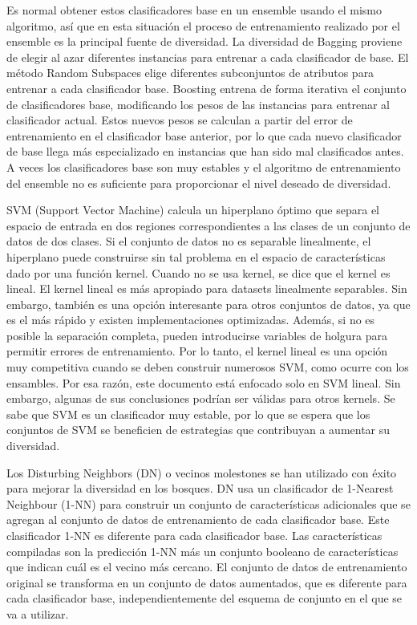 Es normal obtener estos clasificadores base en un ensemble usando el mismo algoritmo, así que en esta situación el proceso de entrenamiento realizado por el ensemble es la principal fuente de diversidad. La diversidad de Bagging proviene de elegir al azar diferentes instancias para entrenar a cada clasificador de base. El método Random Subspaces elige diferentes subconjuntos de atributos para entrenar a cada clasificador base. Boosting entrena de forma iterativa el conjunto de clasificadores base, modificando los pesos de las instancias para entrenar al clasificador actual. Estos nuevos pesos se calculan a partir del error de entrenamiento en el clasificador base anterior, por lo que cada nuevo clasificador de base llega más especializado en instancias que han sido
mal clasificados antes. A veces los clasificadores base son muy estables y el  algoritmo de entrenamiento del ensemble no es suficiente para proporcionar el nivel deseado de diversidad.

SVM (Support Vector Machine) calcula un hiperplano óptimo que separa
el espacio de entrada en dos regiones correspondientes a las clases de un conjunto de datos de dos clases. Si el conjunto de datos no es separable linealmente, el hiperplano puede construirse sin tal problema en el espacio de características dado por una función kernel. Cuando no se usa kernel, se dice que el kernel es lineal. El kernel lineal es más apropiado para datasets linealmente separables. Sin embargo, también es una opción interesante para otros conjuntos de datos, ya que es el más rápido y existen implementaciones optimizadas. Además, si no es posible la separación completa, pueden introducirse variables de holgura para permitir errores de entrenamiento. Por lo tanto, el kernel lineal es una opción muy competitiva cuando se deben construir numerosos SVM, como ocurre con los ensambles. Por esa razón, este documento está enfocado solo en SVM lineal. Sin embargo, algunas de sus conclusiones podrían ser válidas para otros kernels.
Se sabe que SVM es un clasificador muy estable, por lo que se espera que los conjuntos de SVM se beneficien de estrategias que contribuyan a aumentar su diversidad.

Los Disturbing Neighbors (DN) o vecinos molestones se han utilizado con éxito para mejorar la diversidad en los bosques. DN usa un clasificador de 1-Nearest Neighbour (1-NN) para construir un conjunto de características adicionales que se agregan al conjunto de datos de entrenamiento de cada clasificador base. Este clasificador 1-NN es diferente para cada clasificador base. Las características compiladas son la predicción 1-NN más un conjunto booleano de características que indican cuál es el vecino más cercano. El conjunto de datos de entrenamiento original se transforma en un conjunto de datos aumentados, que es diferente para cada clasificador base, independientemente del esquema de conjunto en el que se va a utilizar.

